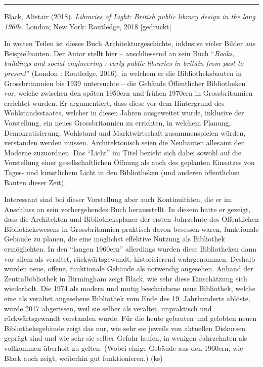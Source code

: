 \documentclass[a4paper,
fontsize=11pt,
oneside,
numbers=noperiodatend,
parskip=half-,
bibliography=totoc,
final
]{scrartcl}
\begin{document}
\begin{center}\rule{0.5\linewidth}{0.5pt}\end{center}

Black, Alistair (2018). \emph{Libraries of Light: British public library
design in the long 1960s}. London; New York: Routledge, 2018
{[}gedruckt{]}

In weiten Teilen ist dieses Buch Architekturgeschichte, inklusive vieler
Bilder aus Beispielbauten. Der Autor stellt hier -- anschliessend an
sein Buch \enquote{\emph{Books, buildings and social engineering : early
public libraries in britain from past to present}} (London : Routledge,
2016), in welchem er die Bibliotheksbauten in Grossbritannien bis 1939
untersuchte -- die Gebäude Öffentlicher Bibliotheken vor, welche
zwischen den späten 1950ern und frühen 1970ern in Grossbritannien
errichtet wurden. Er argumentiert, dass diese vor dem Hintergrund des
Wohlstandsstaates, welcher in diesen Jahren ausgeweitet wurde, inklusive
der Vorstellung, ein neues Grossbritannien zu errichten, in welchem
Planung, Demokratisierung, Wohlstand und Marktwirtschaft zusammenspielen
würden, verstanden werden müssen. Architektonisch seien die Neubauten
allesamt der Moderne zuzuordnen. Das \enquote{Licht} im Titel bezieht
sich dabei sowohl auf die Vorstellung einer gesellschaftlichen Öffnung
als auch des geplanten Einsatzes von Tages- und künstlichem Licht in den
Bibliotheken (und anderen öffentlichen Bauten dieser Zeit).

Interessant sind bei dieser Vorstellung aber auch Kontinuitäten, die er
im Anschluss an sein vorhergehendes Buch herausstellt. In diesem hatte
er gezeigt, dass die Architekten und Bibliotheksplaner der ersten
Jahrzehnte des Öffentlichen Bibliothekswesens in Grossbritannien
praktisch davon besessen waren, funktionale Gebäude zu planen, die eine
möglichst effektive Nutzung als Bibliothek ermöglichten. In den
\enquote{langen 1960ern} allerdings wurden diese Bibliotheken dann vor
allem als veraltet, rückwärtsgewandt, historisierend wahrgenommen.
Deshalb wurden neue, offene, funktionale Gebäude als notwendig
angesehen. Anhand der Zentralbibliothek in Birmingham zeigt Black, wie
sehr diese Einschätzung sich wiederholt. Die 1974 als modern und mutig
beschriebene neue Bibliothek, welche eine als veraltet angesehene
Bibliothek vom Ende des 19. Jahrhunderts ablöste, wurde 2017 abgerissen,
weil sie selber als veraltet, unpraktisch und rückwärtsgewandt
verstanden wurde. Für die heute gebauten und gelobten neuen
Bibliotheksgebäude zeigt das nur, wie sehr sie jeweils von aktuellen
Diskursen geprägt sind und wie sehr sie selber Gefahr laufen, in wenigen
Jahrzehnten als vollkommen überholt zu gelten. (Wobei einige Gebäude aus
den 1960ern, wie Black auch zeigt, weiterhin gut funktionieren.) (ks)
\end{document}
